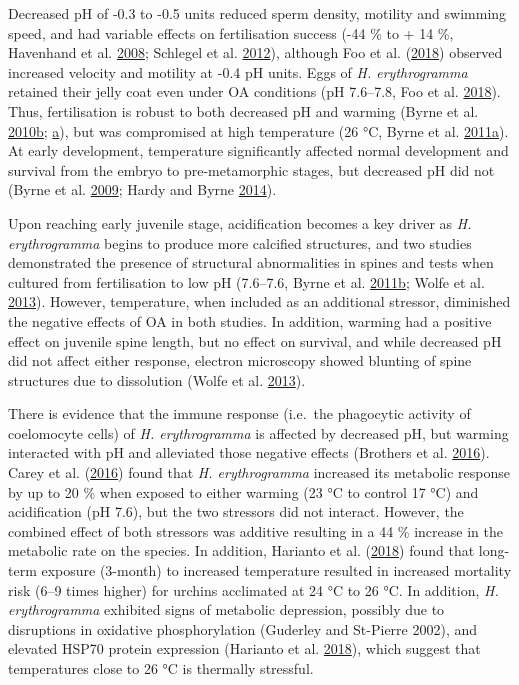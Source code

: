 \documentclass[a4paper,10pt, oneside]{memoir}
\begin{document}
Decreased pH of -0.3 to -0.5 units reduced sperm density, motility and swimming speed, and had variable effects on fertilisation success (-44 \% to + 14 \%, Havenhand et al. \protect\hyperlink{ref-Havenhand2008}{2008}; Schlegel et al. \protect\hyperlink{ref-Schlegel2012}{2012}), although Foo et al. (\protect\hyperlink{ref-Foo2018}{2018}) observed increased velocity and motility at -0.4 pH units.
Eggs of \emph{H. erythrogramma} retained their jelly coat even under OA conditions (pH 7.6--7.8, Foo et al. \protect\hyperlink{ref-Foo2018}{2018}).
Thus, fertilisation is robust to both decreased pH and warming (Byrne et al. \protect\hyperlink{ref-Byrne2010a}{2010}\protect\hyperlink{ref-Byrne2010a}{b}; \protect\hyperlink{ref-Byrne2010}{a}), but was compromised at high temperature (26 °C, Byrne et al. \protect\hyperlink{ref-Byrne2011}{2011}\protect\hyperlink{ref-Byrne2011}{a}).
At early development, temperature significantly affected normal development and survival from the embryo to pre-metamorphic stages, but decreased pH did not (Byrne et al. \protect\hyperlink{ref-Byrne2009}{2009}; Hardy and Byrne \protect\hyperlink{ref-Hardy2014}{2014}).

Upon reaching early juvenile stage, acidification becomes a key driver as \emph{H. erythrogramma} begins to produce more calcified structures, and two studies demonstrated the presence of structural abnormalities in spines and tests when cultured from fertilisation to low pH (7.6--7.6, Byrne et al. \protect\hyperlink{ref-Byrne2011a}{2011}\protect\hyperlink{ref-Byrne2011a}{b}; Wolfe et al. \protect\hyperlink{ref-Wolfe2013}{2013}).
However, temperature, when included as an additional stressor, diminished the negative effects of OA in both studies.
In addition, warming had a positive effect on juvenile spine length, but no effect on survival, and while decreased pH did not affect either response, electron microscopy showed blunting of spine structures due to dissolution (Wolfe et al. \protect\hyperlink{ref-Wolfe2013}{2013}).

There is evidence that the immune response (i.e.~the phagocytic activity of coelomocyte cells) of \emph{H. erythrogramma} is affected by decreased pH, but warming interacted with pH and alleviated those negative effects (Brothers et al. \protect\hyperlink{ref-Brothers2016}{2016}).
Carey et al. (\protect\hyperlink{ref-Carey2016}{2016}) found that \emph{H. erythrogramma} increased its metabolic response by up to 20 \% when exposed to either warming (23 °C to control 17 °C) and acidification (pH 7.6), but the two stressors did not interact.
However, the combined effect of both stressors was additive resulting in a 44 \% increase in the metabolic rate on the species.
In addition, Harianto et al. (\protect\hyperlink{ref-Harianto2018}{2018}) found that long-term exposure (3-month) to increased temperature resulted in increased mortality risk (6--9 times higher) for urchins acclimated at 24 °C to 26 °C.
In addition, \emph{H. erythrogramma} exhibited signs of metabolic depression, possibly due to disruptions in oxidative phosphorylation (Guderley and St-Pierre 2002), and elevated HSP70 protein expression (Harianto et al. \protect\hyperlink{ref-Harianto2018}{2018}), which suggest that temperatures close to 26 °C is thermally stressful.
\end{document}
